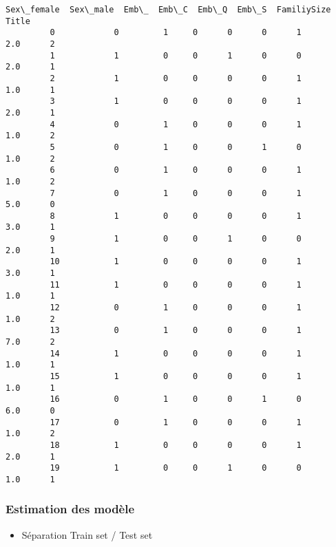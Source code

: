 \documentclass[11pt]{article}
\providecommand{\tightlist}{%
      \setlength{\itemsep}{0pt}\setlength{\parskip}{0pt}}
\begin{document}
\begin{Verbatim}[commandchars=\\\{\}]
             Sex\_female  Sex\_male  Emb\_  Emb\_C  Emb\_Q  Emb\_S  FamiliySize  Title  
         0            0         1     0      0      0      1          2.0      2  
         1            1         0     0      1      0      0          2.0      1  
         2            1         0     0      0      0      1          1.0      1  
         3            1         0     0      0      0      1          2.0      1  
         4            0         1     0      0      0      1          1.0      2  
         5            0         1     0      0      1      0          1.0      2  
         6            0         1     0      0      0      1          1.0      2  
         7            0         1     0      0      0      1          5.0      0  
         8            1         0     0      0      0      1          3.0      1  
         9            1         0     0      1      0      0          2.0      1  
         10           1         0     0      0      0      1          3.0      1  
         11           1         0     0      0      0      1          1.0      1  
         12           0         1     0      0      0      1          1.0      2  
         13           0         1     0      0      0      1          7.0      2  
         14           1         0     0      0      0      1          1.0      1  
         15           1         0     0      0      0      1          1.0      1  
         16           0         1     0      0      1      0          6.0      0  
         17           0         1     0      0      0      1          1.0      2  
         18           1         0     0      0      0      1          2.0      1  
         19           1         0     0      1      0      0          1.0      1  
\end{Verbatim}
            
    \hypertarget{estimation-des-moduxe8le}{%
\subsubsection{Estimation des modèle}\label{estimation-des-moduxe8le}}

    \begin{itemize}
\tightlist
\item
  Séparation Train set / Test set
\end{itemize}
\end{document}
